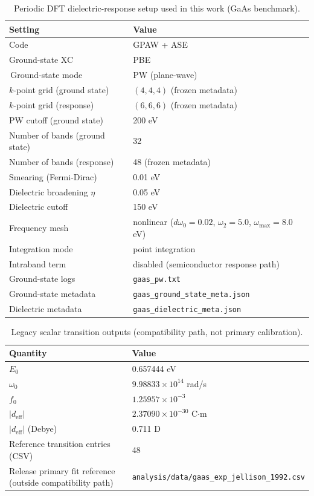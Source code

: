 \documentclass[aps,pra,twocolumn,reprint,superscriptaddress,nofootinbib]{revtex4-2}
\begin{document}
\begin{table}[t]
\centering
\caption{Periodic DFT dielectric-response setup used in this work (GaAs benchmark).}
\label{tab:appendix_dft_settings}
\begin{tabular}{ll}
\toprule
Setting & Value \\
\midrule
Code & GPAW + ASE \\
Ground-state XC & PBE \\
$\,$Ground-state mode & PW (plane-wave) \\
$k$-point grid (ground state) & $(4,4,4)$ (frozen metadata) \\
$k$-point grid (response) & $(6,6,6)$ (frozen metadata) \\
PW cutoff (ground state) & 200 eV \\
Number of bands (ground state) & 32 \\
Number of bands (response) & 48 (frozen metadata) \\
Smearing (Fermi-Dirac) & 0.01 eV \\
Dielectric broadening $\eta$ & 0.05 eV \\
Dielectric cutoff & 150 eV \\
Frequency mesh & nonlinear ($d\omega_0=0.02$, $\omega_2=5.0$, $\omega_{\max}=8.0$ eV) \\
Integration mode & point integration \\
Intraband term & disabled (semiconductor response path) \\
Ground-state logs & \texttt{gaas\_pw.txt} \\
Ground-state metadata & \texttt{gaas\_ground\_state\_meta.json} \\
Dielectric metadata & \texttt{gaas\_dielectric\_meta.json} \\
\bottomrule
\end{tabular}
\end{table}



\begin{table}[t]
\centering
\caption{Legacy scalar transition outputs (compatibility path, not primary calibration).}
\label{tab:appendix_tddft_outputs}
\begin{tabular}{ll}
\toprule
Quantity & Value \\
\midrule
$E_0$ & 0.657444 eV \\
$\omega_0$ & $9.98833\times 10^{14}$ rad/s \\
$f_0$ & $1.25957\times 10^{-3}$ \\
$|d_{\mathrm{eff}}|$ & $2.37090\times 10^{-30}$ C$\cdot$m \\
$|d_{\mathrm{eff}}|$ (Debye) & 0.711 D \\
Reference transition entries (CSV) & 48 \\
Release primary fit reference (outside compatibility path) & \texttt{analysis/data/gaas\_exp\_jellison\_1992.csv} \\
\bottomrule
\end{tabular}
\end{table}
\end{document}
